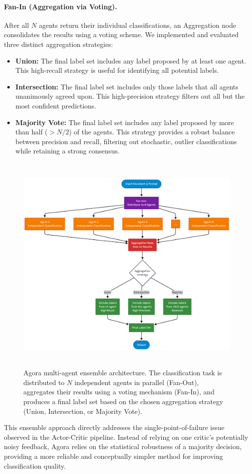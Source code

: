 \paragraph{Fan-In (Aggregation via Voting).} 
After all $N$ agents return their individual classifications, an Aggregation node consolidates the results using a voting scheme. We implemented and evaluated three distinct aggregation strategies:

\begin{itemize}
\item \textbf{Union:} The final label set includes any label proposed by at least one agent. This high-recall strategy is useful for identifying all potential labels.

\item \textbf{Intersection:} The final label set includes only those labels that all agents unanimously agreed upon. This high-precision strategy filters out all but the most confident predictions.

\item \textbf{Majority Vote:} The final label set includes any label proposed by more than half ($> N/2$) of the agents. This strategy provides a robust balance between precision and recall, filtering out stochastic, outlier classifications while retaining a strong consensus.
\end{itemize}

\begin{figure}[!ht]
\centering
\includegraphics[height=11cm]{assets/diagrams/vote-based.png}
\caption{Agora multi-agent ensemble architecture. The classification task is distributed to $N$ independent agents in parallel (Fan-Out), aggregates their results using a voting mechanism (Fan-In), and produces a final label set based on the chosen aggregation strategy (Union, Intersection, or Majority Vote).}
\label{fig:vote_based_ensemble}
\end{figure}

This ensemble approach directly addresses the single-point-of-failure issue observed in the Actor-Critic pipeline. Instead of relying on one critic's potentially noisy feedback, Agora relies on the statistical robustness of a majority decision, providing a more reliable and conceptually simpler method for improving classification quality.
